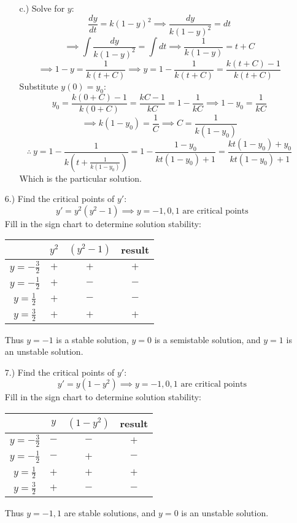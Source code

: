 \documentclass[12pt]{article}
\begin{document}
\begin{itemize}
\begin{itemize}
        \item [c.)] Solve for $y$:
        \[\frac{dy}{dt}=k(1-y)^2\implies\frac{dy}{k(1-y)^2}=dt\]
        \[\implies\int\frac{dy}{k(1-y)^2}=\int dt\implies\frac{1}{k(1-y)}=t+C\]
        \[\implies1-y=\frac{1}{k(t+C)}\implies y=1-\frac{1}{k(t+C)}=\frac{k(t+C)-1}{k(t+C)}\]
        Substitute $y(0)=y_0$:
        \[y_0=\frac{k(0+C)-1}{k(0+C)}=\frac{kC-1}{kC}=1-\frac{1}{kC}\implies 1-y_0=\frac{1}{kC}\]
        \[\implies k(1-y_0)=\frac{1}{C}\implies C=\frac{1}{k(1-y_0)}\]
        \[\therefore\ y=1-\frac{1}{k\left(t+\frac{1}{k(1-y_0)}\right)}=1-\frac{1-y_0}{kt(1-y_0)+1}=\frac{kt(1-y_0)+y_0}{kt(1-y_0)+1}\]
        Which is the particular solution.
    \end{itemize}

    \pagebreak
    \item [6.)] Find the critical points of $y'$:
    \[y'=y^2(y^2-1)\implies y=-1,0,1\text{ are critical points}\]
    Fill in the sign chart to determine solution stability:
    \begin{center}
        \begin{tabular}{c|c|c|c}
            & $y^2$ & $(y^2-1)$ & result\\
            \hline
            $y=-\frac{3}{2}$ & $+$ & $+$ & $+$\\
            $y=-\frac{1}{2}$ & $+$ & $-$ & $-$\\
            $y=\frac{1}{2}$ & $+$ & $-$ & $-$\\
            $y=\frac{3}{2}$ & $+$ & $+$ & $+$\\
        \end{tabular}
    \end{center}
    Thus $y=-1$ is a stable solution, $y=0$ is a semistable solution, and $y=1$ is an unstable solution.

    \item [7.)] Find the critical points of $y'$:
    \[y'=y(1-y^2)\implies y=-1,0,1\text{ are critical points}\]
    Fill in the sign chart to determine solution stability:
    \begin{center}
        \begin{tabular}{c|c|c|c}
            & $y$ & $(1-y^2)$ & result\\
            \hline
            $y=-\frac{3}{2}$ & $-$ & $-$ & $+$\\
            $y=-\frac{1}{2}$ & $-$ & $+$ & $-$\\
            $y=\frac{1}{2}$ & $+$ & $+$ & $+$\\
            $y=\frac{3}{2}$ & $+$ & $-$ & $-$\\
        \end{tabular}
    \end{center}
    Thus $y=-1,1$ are stable solutions, and $y=0$ is an unstable solution.


\end{itemize}
\end{document}
